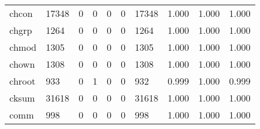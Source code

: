 \begin{longtable}{lp{2.0cm}p{2.0cm}p{2.0cm}p{2.0cm}p{2.0cm}p{2.0cm}p{2.0cm}p{2.0cm}p{2.0cm}}
chcon     &                  17348 &                                  0 &                                 0 &                                0 &                                 0 &                           17348 &                                   1.000 &                                  1.000 &                                1.000 \\
chgrp     &                   1264 &                                  0 &                                 0 &                                0 &                                 0 &                            1264 &                                   1.000 &                                  1.000 &                                1.000 \\
chmod     &                   1305 &                                  0 &                                 0 &                                0 &                                 0 &                            1305 &                                   1.000 &                                  1.000 &                                1.000 \\
chown     &                   1308 &                                  0 &                                 0 &                                0 &                                 0 &                            1308 &                                   1.000 &                                  1.000 &                                1.000 \\
chroot    &                    933 &                                  0 &                                 1 &                                0 &                                 0 &                             932 &                                   0.999 &                                  1.000 &                                0.999 \\
cksum     &                  31618 &                                  0 &                                 0 &                                0 &                                 0 &                           31618 &                                   1.000 &                                  1.000 &                                1.000 \\
comm      &                    998 &                                  0 &                                 0 &                                0 &                                 0 &                             998 &                                   1.000 &                                  1.000 &                                1.000 \\

\end{longtable}
